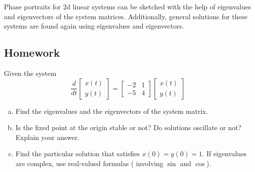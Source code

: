 \begin{weekintro}
  Phase portraits for 2d linear systems can be sketched with the help of eigenvalues and eigenvectors of the system matrices. Additionally, general solutions for these systems are found again using eigenvalues and eigenvectors.
\end{weekintro}

\subsection*{Homework}

\begin{question}
Given the system
  \[
    \frac{d}{dt}
    \begin{bmatrix}
      x(t) \\ y(t)
    \end{bmatrix} =
    \begin{bmatrix}
    -2 & 1 \\ -5 & 4
    \end{bmatrix}
    \begin{bmatrix}
      x(t) \\ y(t)
    \end{bmatrix}
  \]
  \begin{enumerate}[(a)]
  \item Find the eigenvalues and the eigenvectors of the system matrix.
\solspace{3in}
  \item Is the fixed point at the origin stable or not? Do solutions oscillate or not? Explain your answer.
\solspace{0.5in}
  \item Find the particular solution that satisfies \(x(0) = y(0) = 1\). If eigenvalues are complex, use real-valued formulas ( involving \(\sin\) and \(\cos\)).
\solspace{3in}
\end{enumerate}
\end{question}

